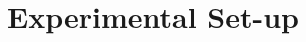 \chapter{\label{method}Experimental Set-up}

\setcounter{equation}{0}
\setcounter{table}{0}
\setcounter{figure}{0}

